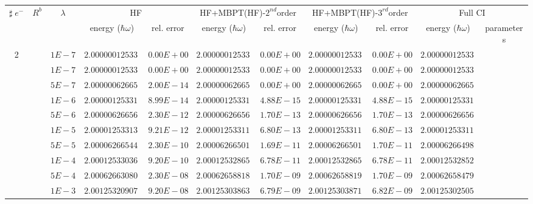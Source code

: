 \begin{landscape}
\begin{table}[ht]
\centering      %
{\tiny
\begin{tabular}[c]{c|c|c|c|c|c|c|c|c|c|c} 
\toprule[1pt]
\multicolumn{1}{c|}{$\sharp \; e^{-}$}  & \multicolumn{1}{c|}{$R^b$} & \multicolumn{1}{c|}{$\lambda$} & \multicolumn{2}{c|}{HF}& \multicolumn{2}{c|}{HF+MBPT(HF)-$2^{nd}$order}& \multicolumn{2}{c|}{HF+MBPT(HF)-$3^{rd}$order}& \multicolumn{2}{c}{Full CI}\\
\multicolumn{1}{c|}{}  & \multicolumn{1}{c|}{} & \multicolumn{1}{c|}{} & \multicolumn{1}{c|}{energy ($\hbar \omega$)}& \multicolumn{1}{c|}{rel. error} & \multicolumn{1}{c|}{energy ($\hbar \omega$)}& \multicolumn{1}{c|}{rel. error}& \multicolumn{1}{c|}{energy ($\hbar \omega$)} &\multicolumn{1}{c|}{rel. error}& \multicolumn{1}{c|}{energy ($\hbar \omega$)}& \multicolumn{1}{c}{parameters}\\
\hline
\multirow{56}{*}{2} & &$1E-7$ & $2.000000125331$ & $0.00E+00$ & $2.000000125331$ & $0.00E+00$ & $2.000000125331$ & $0.00E+00$ & $2.000000125331$ &  \\& &$1E-7$ & $2.000000125331$ & $0.00E+00$ & $2.000000125331$ & $0.00E+00$ & $2.000000125331$ & $0.00E+00$ & $2.000000125331$ &  \\
& &$5E-7$ & $2.000000626657$ & $2.00E-14$ & $2.000000626657$ & $0.00E+00$ & $2.000000626657$ & $0.00E+00$ & $2.000000626657$ &  \\
& &$1E-6$ & $2.000001253314$ & $8.99E-14$ & $2.000001253314$ & $4.88E-15$ & $2.000001253314$ & $4.88E-15$ & $2.000001253314$ &  \\
& &$5E-6$ & $2.000006266568$ & $2.30E-12$ & $2.000006266564$ & $1.70E-13$ & $2.000006266564$ & $1.70E-13$ & $2.000006266563$ &  \\
& &$1E-5$ & $2.000012533131$ & $9.21E-12$ & $2.000012533114$ & $6.80E-13$ & $2.000012533114$ & $6.80E-13$ & $2.000012533112$ &  \\
& &$5E-5$ & $2.000062665444$ & $2.30E-10$ & $2.000062665018$ & $1.69E-11$ & $2.000062665018$ & $1.70E-11$ & $2.000062664984$ &  \\
& &$1E-4$ & $2.000125330363$ & $9.20E-10$ & $2.000125328658$ & $6.78E-11$ & $2.000125328658$ & $6.78E-11$ & $2.000125328523$ &  \\
& &$5E-4$ & $2.000626630801$ & $2.30E-08$ & $2.000626588186$ & $1.70E-09$ & $2.000626588196$ & $1.70E-09$ & $2.000626584794$ &  \\
& &$1E-3$ & $2.001253209074$ & $9.20E-08$ & $2.001253038639$ & $6.79E-09$ & $2.001253038713$ & $6.82E-09$ & $2.001253025058$ &  \\

\end{tabular}}
\end{table}
\end{landscape}
